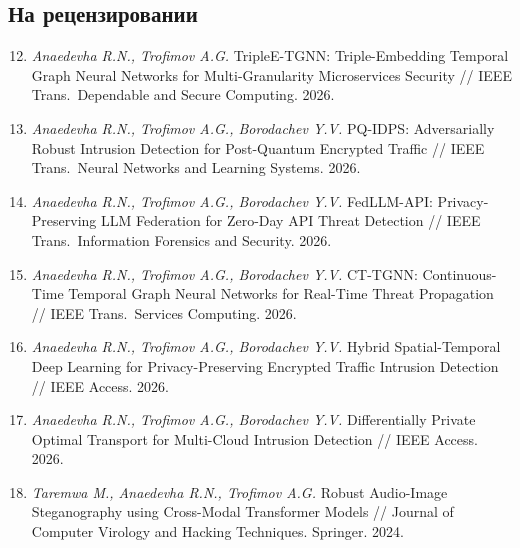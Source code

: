\documentclass[12pt,a5paper]{article}
\begin{document}
\subsection*{На рецензировании}

\begin{enumerate}
\setcounter{enumi}{11}
\item \textit{Anaedevha R.N., Trofimov A.G.} TripleE-TGNN: Triple-Embedding Temporal Graph Neural Networks for Multi-Granularity Microservices Security // IEEE Trans.\ Dependable and Secure Computing. 2026.

\item \textit{Anaedevha R.N., Trofimov A.G., Borodachev Y.V.} PQ-IDPS: Adversarially Robust Intrusion Detection for Post-Quantum Encrypted Traffic // IEEE Trans.\ Neural Networks and Learning Systems. 2026.

\item \textit{Anaedevha R.N., Trofimov A.G., Borodachev Y.V.} FedLLM-API: Privacy-Preserving LLM Federation for Zero-Day API Threat Detection // IEEE Trans.\ Information Forensics and Security. 2026.

\item \textit{Anaedevha R.N., Trofimov A.G., Borodachev Y.V.} CT-TGNN: Continuous-Time Temporal Graph Neural Networks for Real-Time Threat Propagation // IEEE Trans.\ Services Computing. 2026.

\item \textit{Anaedevha R.N., Trofimov A.G., Borodachev Y.V.} Hybrid Spatial-Temporal Deep Learning for Privacy-Preserving Encrypted Traffic Intrusion Detection // IEEE Access. 2026.

\item \textit{Anaedevha R.N., Trofimov A.G., Borodachev Y.V.} Differentially Private Optimal Transport for Multi-Cloud Intrusion Detection // IEEE Access. 2026.

\item \textit{Taremwa M., Anaedevha R.N., Trofimov A.G.} Robust Audio-Image Steganography using Cross-Modal Transformer Models // Journal of Computer Virology and Hacking Techniques. Springer. 2024.
\end{enumerate}
\end{document}
